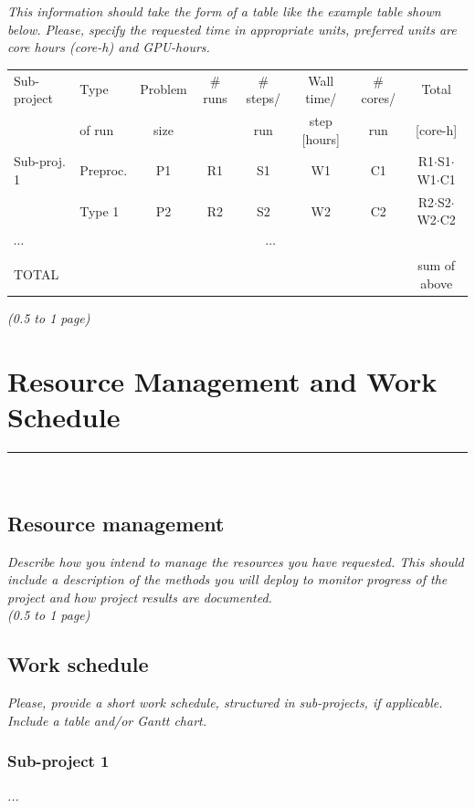 \documentclass [a4paper, 12pt]{article}
\begin{document}
\textit{This information should take the form of a table like the example table shown below. Please, specify the requested time in appropriate units, preferred units are core hours (core-h) and GPU-hours.}\\



\begin{tabular}{llcccccc} \hline\hline
  Sub-project & 
  Type &
  Problem & 
  \# runs & 
  \# steps/ & 
  Wall time/ & 
  \# cores/ & 
  Total \\
  &
  of run &
  size  &
  &
  run &
  step [hours] &
  run &
  [core-h] \\
 \hline\hline
  Sub-proj. 1 & 
  Preproc. &
  P1 & 
  R1 & 
  S1 &
  W1 &
  C1 &
  R1$\cdot$S1$\cdot$W1$\cdot$C1 \\
   ~     &
  Type 1 &
  P2 & 
  R2 & 
  S2 &
  W2 &
  C2 &
  R2$\cdot$S2$\cdot$W2$\cdot$C2 \\
$\cdots$ &\multicolumn{7}{c}{$\cdots$}\\
\hline\hline
TOTAL & & & & & & & sum of above\\
\end{tabular}
\bigskip

\textit{(0.5 to 1 page)}

\section{Resource Management and Work Schedule}
\rule{\textwidth}{0.4pt}\\
\subsection{Resource management}
\textit{Describe how you intend to manage the resources you have requested. This should include a description of the methods you will deploy to monitor progress of the project and how project results are documented.}\\

\textit{(0.5 to 1 page)}

\subsection{Work schedule}
\textit{Please, provide a short work schedule, structured in sub-projects, if applicable. Include a table and/or Gantt chart.}

\subsubsection{Sub-project 1}
\textit{...}
\end{document}
